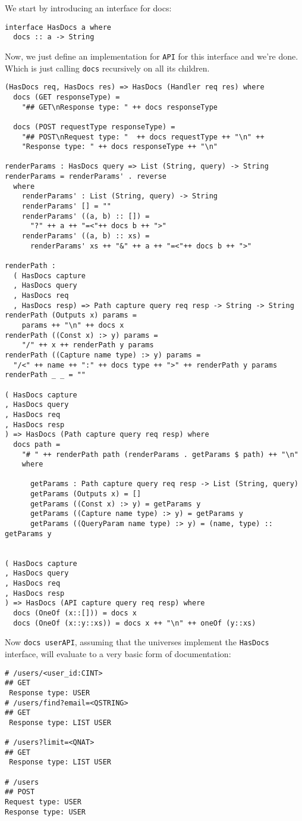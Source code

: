 \documentclass[12pt,a4paper]{article}
\begin{document}
We start by introducing an interface for docs:
\begin{verbatim}
interface HasDocs a where
  docs :: a -> String
\end{verbatim}
Now, we just define an implementation for \texttt{API} for this interface and we're done. Which is just calling \texttt{docs} recursively on all its children.

\begin{verbatim}
(HasDocs req, HasDocs res) => HasDocs (Handler req res) where
  docs (GET responseType) =
    "## GET\nResponse type: " ++ docs responseType

  docs (POST requestType responseType) =
    "## POST\nRequest type: "  ++ docs requestType ++ "\n" ++
    "Response type: " ++ docs responseType ++ "\n"

renderParams : HasDocs query => List (String, query) -> String
renderParams = renderParams' . reverse
  where
    renderParams' : List (String, query) -> String
    renderParams' [] = ""
    renderParams' ((a, b) :: []) =
      "?" ++ a ++ "=<"++ docs b ++ ">"
    renderParams' ((a, b) :: xs) =
      renderParams' xs ++ "&" ++ a ++ "=<"++ docs b ++ ">"

renderPath : 
  ( HasDocs capture
  , HasDocs query
  , HasDocs req
  , HasDocs resp) => Path capture query req resp -> String -> String
renderPath (Outputs x) params = 
    params ++ "\n" ++ docs x
renderPath ((Const x) :> y) params =
    "/" ++ x ++ renderPath y params
renderPath ((Capture name type) :> y) params =
  "/<" ++ name ++ ":" ++ docs type ++ ">" ++ renderPath y params
renderPath _ _ = ""

( HasDocs capture
, HasDocs query
, HasDocs req
, HasDocs resp
) => HasDocs (Path capture query req resp) where
  docs path =
    "# " ++ renderPath path (renderParams . getParams $ path) ++ "\n"
    where

      getParams : Path capture query req resp -> List (String, query)
      getParams (Outputs x) = []
      getParams ((Const x) :> y) = getParams y
      getParams ((Capture name type) :> y) = getParams y
      getParams ((QueryParam name type) :> y) = (name, type) :: getParams y


( HasDocs capture
, HasDocs query
, HasDocs req
, HasDocs resp
) => HasDocs (API capture query req resp) where
  docs (OneOf (x::[])) = docs x
  docs (OneOf (x::y::xs)) = docs x ++ "\n" ++ oneOf (y::xs)
\end{verbatim}

Now \texttt{docs userAPI}, assuming that the universes implement
the \texttt{HasDocs} interface, will evaluate to a very basic form of documentation:
\begin{verbatim}
# /users/<user_id:CINT>
## GET
 Response type: USER
# /users/find?email=<QSTRING>
## GET
 Response type: LIST USER

# /users?limit=<QNAT>
## GET
 Response type: LIST USER

# /users
## POST
Request type: USER
Response type: USER

\end{verbatim}
\end{document}

